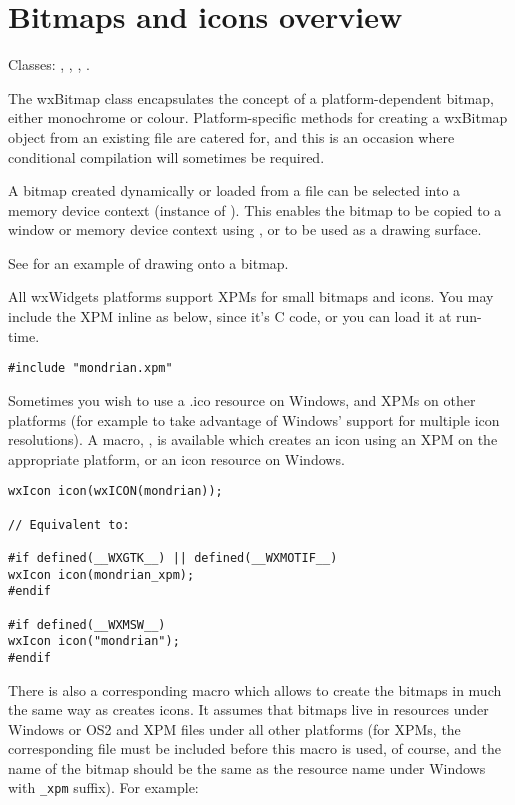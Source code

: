 \section{Bitmaps and icons overview}\label{wxbitmapoverview}

Classes: , , , .

The wxBitmap class encapsulates the concept of a platform-dependent bitmap,
either monochrome or colour. Platform-specific methods for creating a
wxBitmap object from an existing file are catered for, and
this is an occasion where conditional compilation will sometimes be
required.

A bitmap created dynamically or loaded from a file can be selected
into a memory device context (instance of ). This
enables the bitmap to be copied to a window or memory device context
using , or to be used as a drawing surface.

See  for an example of drawing onto a bitmap.

All wxWidgets platforms support XPMs for small bitmaps and icons.
You may include the XPM inline as below, since it's C code, or you
can load it at run-time.

\begin{verbatim}
#include "mondrian.xpm"
\end{verbatim}

Sometimes you wish to use a .ico resource on Windows, and XPMs on
other platforms (for example to take advantage of Windows' support for multiple icon resolutions).
A macro, , is available which creates an icon using an XPM
on the appropriate platform, or an icon resource on Windows.

\begin{verbatim}
wxIcon icon(wxICON(mondrian));

// Equivalent to:

#if defined(__WXGTK__) || defined(__WXMOTIF__)
wxIcon icon(mondrian_xpm);
#endif

#if defined(__WXMSW__)
wxIcon icon("mondrian");
#endif
\end{verbatim}

There is also a corresponding  macro which allows
to create the bitmaps in much the same way as  creates
icons. It assumes that bitmaps live in resources under Windows or OS2 and XPM
files under all other platforms (for XPMs, the corresponding file must be
included before this macro is used, of course, and the name of the bitmap
should be the same as the resource name under Windows with {\tt \_xpm}
suffix). For example:


